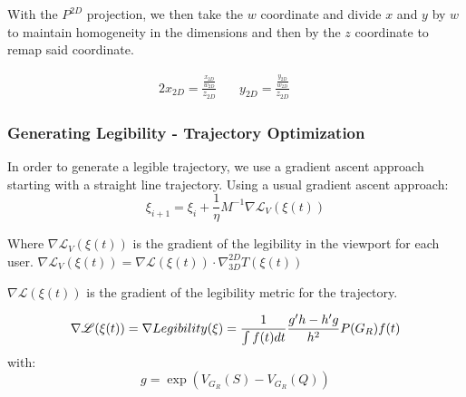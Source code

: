 \documentclass[a4paper,11pt,times,doublespace]{article}
\begin{document}
With the $P^{2D}$ projection, we then take the $w$ coordinate and divide $x$ and $y$ by $w$ to maintain homogeneity in the dimensions and then by the $z$ coordinate to remap said coordinate.

	\begin{alignat*}{2}
		x_{2D} = \frac{\frac{x_{2D}}{w_{2D}}}{z_{2D}} &\quad
		y_{2D} = \frac{\frac{y_{2D}}{w_{2D}}}{z_{2D}} &\quad
	\end{alignat*}

\subsubsection{Generating Legibility - Trajectory Optimization}	

In order to generate a legible trajectory, we use a gradient ascent approach starting with a straight line trajectory. Using a usual gradient ascent approach:
\begin{equation*}
	\xi_{i+1} = \xi_i + \frac{1}{\eta} M^{-1} \nabla \mathcal{L}_V(\xi(t))
\end{equation*}

Where $\nabla \mathcal{L}_V(\xi(t))$ is the gradient of the legibility in the viewport for each user. $\nabla \mathcal{L}_V(\xi(t)) = \nabla \mathcal{L}(\xi(t)) \cdot \nabla_{3D}^{2D} T(\xi(t))$

$\nabla \mathcal{L}(\xi(t))$ is the gradient of the legibility metric for the trajectory.

\begin{equation*}
		\nabla \mathcal{L}(\xi(t)) = \nabla Legibility(\xi) = \frac{1}{\int f(t) dt}\frac{g'h - h'g}{h^2} P(G_R) f(t) \\
\end{equation*}
with:
\begin{equation*}
	g = \exp(V_{G_R}(S) - V_{G_R}(Q))
\end{equation*} 
\end{document}
